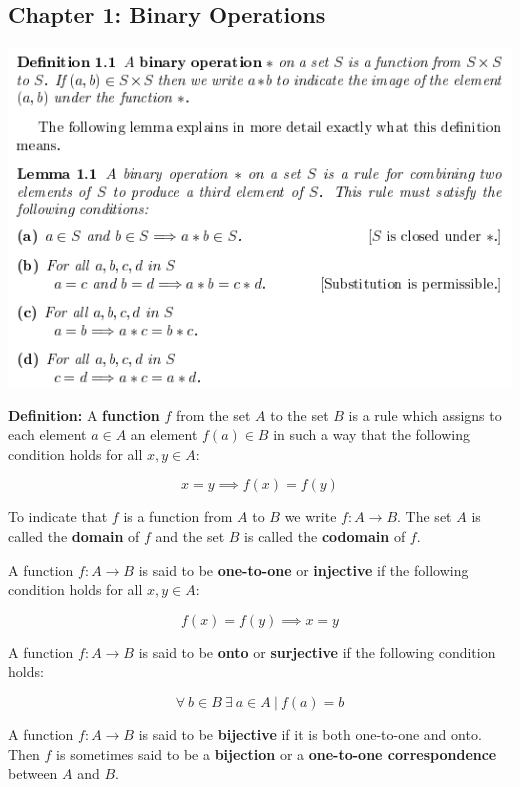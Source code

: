 \documentclass{article}
\begin{document}
\subsection{Chapter 1: Binary Operations}

\includegraphics[scale=0.65]{binary_operation}


\textbf{Definition:} A \textbf{function} \(f\) from the set \(A\) to the set \(B\) is a rule which assigns to each element \(a \in A\) an element \(f(a) \in B\) in such a way that the following condition holds for all \(x, y \in A\):

\[
x = y \implies f(x) = f(y)
\]

To indicate that \(f\) is a function from \(A\) to \(B\) we write \(f: A \to B\). The set \(A\) is called the \textbf{domain} of \(f\) and the set \(B\) is called the \textbf{codomain} of \(f\).


A function \(f: A \to B\) is said to be \textbf{one-to-one} or \textbf{injective} if the following condition holds for all \(x, y \in A\):

\[
f(x) = f(y) \implies x = y
\]

A function \(f: A \to B\) is said to be \textbf{onto} or \textbf{surjective} if the following condition holds:

\[
\forall \ b \in B \ \exists \ a \in A \ | \ f(a) = b
\]

A function \(f: A \to B\) is said to be \textbf{bijective} if it is both one-to-one and onto. Then \(f\) is sometimes said to be a \textbf{bijection} or a \textbf{one-to-one correspondence} between \(A\) and \(B\).
\end{document}
